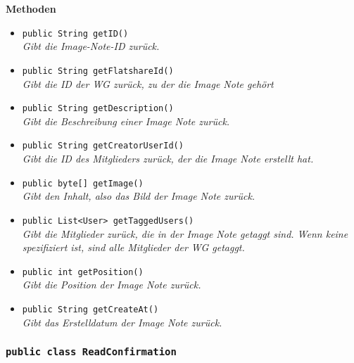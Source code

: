 	\textbf{Methoden}
	\begin{itemize}
		\item\texttt{{public String getID()}}\\
		\textit{Gibt die Image-Note-ID zurück.}\\
		
		\item\texttt{{public String getFlatshareId()}}\\
		\textit{Gibt die ID der WG zurück, zu der die Image Note gehört}\\
		
		\item\texttt{{public String getDescription()}}\\
		\textit{Gibt die Beschreibung einer Image Note zurück.}\\
		
		\item\texttt{{public String getCreatorUserId()}}\\
		\textit{Gibt die ID des Mitglieders zurück, der die Image Note erstellt hat.}\\
		
		\item\texttt{{public byte[] getImage()}}\\
		\textit{Gibt den Inhalt, also das Bild der Image Note zurück.}\\
		
		\item\texttt{{public List<User> getTaggedUsers()}}\\
		\textit{Gibt die Mitglieder zurück, die in der Image Note getaggt sind. Wenn keine spezifiziert ist, sind alle Mitglieder der WG getaggt.}\\
		
		\item\texttt{{public int getPosition()}}\\
		\textit{Gibt die Position der Image Note zurück.}\\
		
		\item\texttt{{public String getCreateAt()}}\\
		\textit{Gibt das Erstelldatum der Image Note zurück.}\\
	\end{itemize}

\subsubsection{\texttt{public class ReadConfirmation}}

